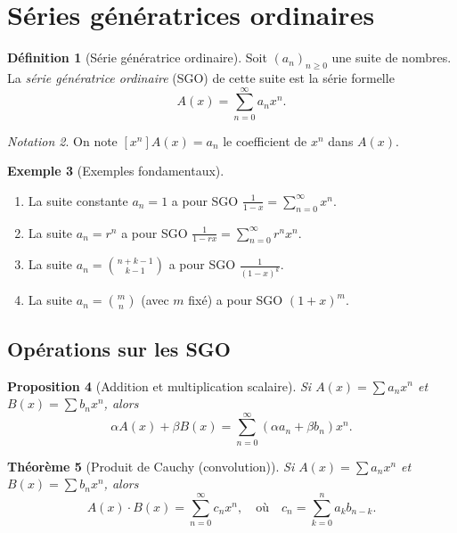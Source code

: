 \documentclass[12pt,a4paper,openany]{book}
\theoremstyle{definition}
\newtheorem{definition}{Définition}[chapter]
\newtheorem{exemple}[definition]{Exemple}
\theoremstyle{plain}
\newtheorem{theoreme}[definition]{Théorème}
\newtheorem{proposition}[definition]{Proposition}
\theoremstyle{remark}
\newtheorem{notation}[definition]{Notation}
\begin{document}
\section{Séries génératrices ordinaires}
\label{sec:ogf}

\begin{definition}[Série génératrice ordinaire]
\label{def:ogf}
Soit $(a_n)_{n \geqslant 0}$ une suite de nombres. La \emph{série génératrice
ordinaire} (SGO) de cette suite est la série formelle
\[
  A(x) = \sum_{n=0}^{\infty} a_n x^n.
\]
\end{definition}

\begin{notation}
\label{not:coefficient}
On note $[x^n] A(x) = a_n$ le coefficient de $x^n$ dans $A(x)$.
\end{notation}

\begin{exemple}[Exemples fondamentaux]
\label{ex:ogf-fondamentaux}
\begin{enumerate}[label=\roman*)]
  \item La suite constante $a_n = 1$ a pour SGO
    $\displaystyle\frac{1}{1-x} = \sum_{n=0}^{\infty} x^n$.
  \item La suite $a_n = r^n$ a pour SGO
    $\displaystyle\frac{1}{1-rx} = \sum_{n=0}^{\infty} r^n x^n$.
  \item La suite $a_n = \binom{n+k-1}{k-1}$ a pour SGO
    $\displaystyle\frac{1}{(1-x)^k}$.
  \item La suite $a_n = \binom{m}{n}$ (avec $m$ fixé) a pour SGO $(1+x)^m$.
\end{enumerate}
\end{exemple}

\subsection{Opérations sur les SGO}
\label{sec:ogf-operations}

\begin{proposition}[Addition et multiplication scalaire]
\label{prop:ogf-lineaire}
Si $A(x) = \sum a_n x^n$ et $B(x) = \sum b_n x^n$, alors
\[
  \alpha A(x) + \beta B(x) = \sum_{n=0}^{\infty} (\alpha a_n + \beta b_n) x^n.
\]
\end{proposition}

\begin{theoreme}[Produit de Cauchy (convolution)]
\label{thm:ogf-produit}
Si $A(x) = \sum a_n x^n$ et $B(x) = \sum b_n x^n$, alors
\[
  A(x) \cdot B(x) = \sum_{n=0}^{\infty} c_n x^n,
  \quad \text{où} \quad
  c_n = \sum_{k=0}^{n} a_k b_{n-k}.
\]
\end{theoreme}
\end{document}
